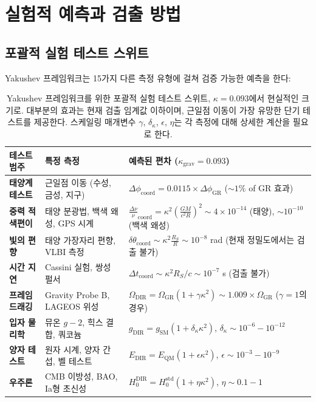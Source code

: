 \documentclass[11pt,a4paper]{article}
\begin{document}
\section{실험적 예측과 검출 방법}
\subsection{포괄적 실험 테스트 스위트}

Yakushev 프레임워크는 15가지 다른 측정 유형에 걸쳐 검증 가능한 예측을 한다:

\begin{table}[htbp]
\centering
\scriptsize
\begin{tabular}{p{}p{}p{}}
	\toprule
	\textbf{테스트 범주} & \textbf{특정 측정} & \textbf{예측된 편차 ($\kappa_{\text{grav}} = 0.093$)} \\
	\midrule
	\textbf{태양계 테스트} & 
	근일점 이동 (수성, 금성, 지구) &
	$\Delta\phi_{\text{coord}} = 0.0115 \times \Delta\phi_{\text{GR}}$ ($\sim 1\%$ of GR 효과) \\
	\hline
	\textbf{중력 적색편이} &
	태양 분광법, 백색 왜성, GPS 시계 &
	$\frac{\Delta\nu}{\nu}_{\text{coord}} = \kappa^2\left(\frac{GM}{c^2R}\right)^2 \sim 4\times10^{-14}$ (태양), $\sim 10^{-10}$ (백색 왜성) \\
	\hline
	\textbf{빛의 편향} &
	태양 가장자리 편향, VLBI 측정 &
	$\delta\theta_{\text{coord}} \sim \kappa^2 \frac{R_S}{R} \sim 10^{-8}$ rad (현재 정밀도에서는 검출 불가) \\
	\hline
	\textbf{시간 지연} &
	Cassini 실험, 쌍성 펄서 &
	$\Delta t_{\text{coord}} \sim \kappa^2 R_S/c \sim 10^{-7}$ s (검출 불가) \\
	\hline
	\textbf{프레임 드래깅} &
	Gravity Probe B, LAGEOS 위성 &
	$\Omega_{\text{DIR}} = \Omega_{\text{GR}} (1 + \gamma \kappa^2) \sim 1.009 \times \Omega_{\text{GR}}$ ($\gamma=1$의 경우) \\
	\hline
	\textbf{입자 물리학} &
	뮤온 $g-2$, 힉스 결합, 쿼코늄 &
	$g_{\text{DIR}} = g_{\text{SM}} (1 + \delta_\kappa \kappa^2)$, $\delta_\kappa \sim 10^{-6} - 10^{-12}$ \\
	\hline
	\textbf{양자 테스트} &
	원자 시계, 양자 간섭, 벨 테스트 &
	$E_{\text{DIR}} = E_{\text{QM}} (1 + \epsilon \kappa^2)$, $\epsilon \sim 10^{-3} - 10^{-9}$ \\
	\hline
	\textbf{우주론} &
	CMB 이방성, BAO, Ia형 초신성 &
	$H_0^{\text{DIR}} = H_0^{\text{std}} (1 + \eta \kappa^2)$, $\eta \sim 0.1 - 1$ \\
	\bottomrule
\end{tabular}
\caption{Yakushev 프레임워크를 위한 포괄적 실험 테스트 스위트, $\kappa = 0.093$에서 현실적인 크기로. 대부분의 효과는 현재 검출 임계값 이하이며, 근일점 이동이 가장 유망한 단기 테스트를 제공한다. 스케일링 매개변수 $\gamma$, $\delta_\kappa$, $\epsilon$, $\eta$는 각 측정에 대해 상세한 계산을 필요로 한다.}
\end{table}
\end{document}
